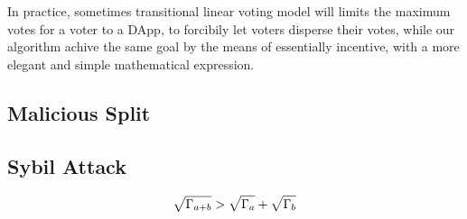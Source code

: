 In practice, sometimes transitional  linear voting model will limits the maximum votes for a voter to a DApp, to forcibily let voters disperse their votes, while our algorithm achive the same goal by the means of essentially incentive,  with a more elegant and simple mathematical expression. 

\begin{corollary}

\end{corollary}

\subsection{Malicious Split}
\label{subsec:5.2}

\begin{property}
	\label{p2}

\end{property}
\begin{corollary}
	\label{c1}
\end{corollary}

\subsection{Sybil Attack}


\begin{align}
	\label{eq:sqrt_nr}
	\sqrt{\Gamma_{a+b}}>\sqrt{\Gamma_a}+\sqrt{\Gamma_b}
\end{align}

\begin{property}
	\label{p3}

\end{property}

